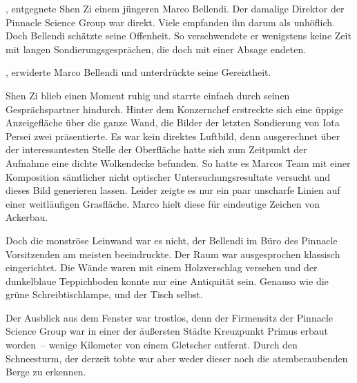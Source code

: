, entgegnete Shen Zi einem jüngeren Marco Bellendi. Der damalige Direktor der Pinnacle Science Group war direkt. Viele empfanden ihn darum als unhöflich. Doch Bellendi schätzte seine Offenheit. So verschwendete er wenigstens keine Zeit mit langen Sondierungsgesprächen, die doch mit einer Absage endeten. 

\par

, erwiderte Marco Bellendi und unterdrückte seine Gereiztheit. 

\par

Shen Zi blieb einen Moment ruhig und starrte einfach durch seinen Gesprächspartner hindurch. Hinter dem Konzernchef erstreckte sich eine üppige Anzeigefläche über die ganze Wand, die Bilder der letzten Sondierung von Iota Persei zwei präsentierte. Es war kein direktes Luftbild, denn ausgerechnet über der interessantesten Stelle der Oberfläche hatte sich zum Zeitpunkt der Aufnahme eine dichte Wolkendecke befunden. So hatte es Marcos Team mit einer Komposition sämtlicher nicht optischer Untersuchungsresultate versucht und dieses Bild generieren lassen. Leider zeigte es nur ein paar unscharfe Linien auf einer weitläufigen Grasfläche. Marco hielt diese für eindeutige Zeichen von Ackerbau.

\par

Doch die monströse Leinwand war es nicht, der Bellendi im Büro des Pinnacle Vorsitzenden am meisten beeindruckte. Der Raum war ausgesprochen klassisch eingerichtet. Die Wände waren mit einem Holzverschlag versehen und der dunkelblaue Teppichboden konnte nur eine Antiquität sein. Genauso wie die grüne Schreibtischlampe, und der Tisch selbst.

\par

Der Ausblick aus dem Fenster war trostlos, denn der Firmensitz der Pinnacle Science Group war in einer der äußersten Städte Kreuzpunkt Primus erbaut worden~-- wenige Kilometer von einem Gletscher entfernt. Durch den Schneesturm, der derzeit tobte war aber weder dieser noch die atemberaubenden Berge zu erkennen.

